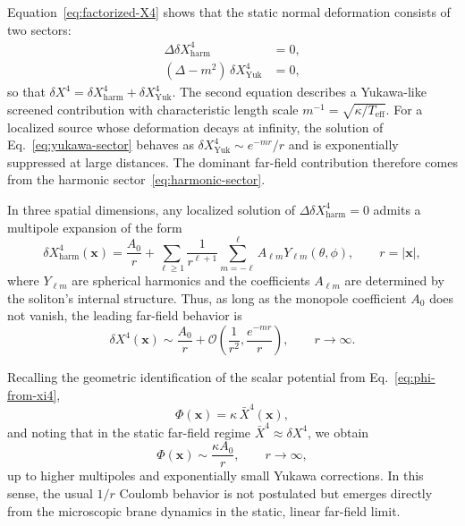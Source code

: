 Equation~\eqref{eq:factorized-X4} shows that the static normal
deformation consists of two sectors:
\begin{align}
  \Delta \delta X^4_\mathrm{harm} &= 0,
  \label{eq:harmonic-sector}
  \\
  (\Delta - m^2)\,\delta X^4_\mathrm{Yuk} &= 0,
  \label{eq:yukawa-sector}
\end{align}
so that $\delta X^4 = \delta X^4_\mathrm{harm} + \delta X^4_\mathrm{Yuk}$.
The second equation describes a Yukawa-like screened contribution with
characteristic length scale $m^{-1} = \sqrt{\kappa/T_{\mathrm{eff}}}$.
For a localized source whose deformation decays at infinity, the
solution of Eq.~\eqref{eq:yukawa-sector} behaves as
$\delta X^4_\mathrm{Yuk} \sim e^{-mr}/r$ and is exponentially suppressed
at large distances. The dominant far-field contribution therefore comes
from the harmonic sector~\eqref{eq:harmonic-sector}.

In three spatial dimensions, any localized solution of
$\Delta \delta X^4_\mathrm{harm} = 0$ admits a multipole expansion of the
form
\begin{equation}
  \delta X^4_\mathrm{harm}(\mathbf x)
  =
  \frac{A_0}{r}
  + \sum_{\ell\ge 1}\frac{1}{r^{\ell+1}}
    \sum_{m=-\ell}^{\ell} A_{\ell m} Y_{\ell m}(\theta,\phi),
  \qquad r = |\mathbf x|,
  \label{eq:X4-multipole}
\end{equation}
where $Y_{\ell m}$ are spherical harmonics and the coefficients
$A_{\ell m}$ are determined by the soliton's internal structure. Thus,
as long as the monopole coefficient $A_0$ does not vanish, the leading
far-field behavior is
\begin{equation}
  \delta X^4(\mathbf x)
  \sim
  \frac{A_0}{r}
  + \mathcal O\!\left(\frac{1}{r^2},\frac{e^{-mr}}{r}\right),
  \qquad r\to\infty.
  \label{eq:X4-far-field}
\end{equation}

Recalling the geometric identification of the scalar potential from
Eq.~\eqref{eq:phi-from-xi4},
\begin{equation}
  \Phi(\mathbf x) = \kappa\,\bar X^4(\mathbf x),
\end{equation}
and noting that in the static far-field regime
$\bar X^4 \approx \delta X^4$, we obtain
\begin{equation}
  \Phi(\mathbf x)
  \sim \frac{\kappa A_0}{r},
  \qquad r\to\infty,
\end{equation}
up to higher multipoles and exponentially small Yukawa corrections.
In this sense, the usual $1/r$ Coulomb behavior is not postulated but
emerges directly from the microscopic brane dynamics in the static,
linear far-field limit.

